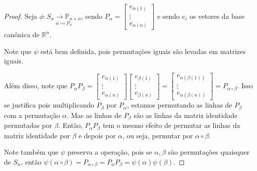 \documentclass[a4paper,portuguese,11pt,twoside, leqno]{book}
\theoremstyle{definition}
\begin{document}
	\begin{proof}
		Seja $\phi: \underset{\alpha\mapsto P_{\alpha}}{S_n\to\mathbb{P}_{n\times n}}$, sendo $\displaystyle{P_{\alpha} = \begin{bmatrix}
			e_{\alpha(1)} \\
			\vdots \\
			e_{\alpha(n)}
			\end{bmatrix}}$ e sendo $e_i$ os vetores da base canônica de $\mathbb{R}^n$.
		
		\par\vspace{0.3cm}
		
		Note que $\psi$ está bem definida, pois permutações iguais são levadas em matrizes iguais.
		
		\par\vspace{0.3cm}
		
		Além disso, note que $\displaystyle{ P_{\alpha}P_{\beta} = \begin{bmatrix}
			e_{\alpha(1)} \\
			\vdots \\
			e_{\alpha(n)}
			\end{bmatrix}\begin{bmatrix}
			e_{\beta(1)} \\
			\vdots \\
			e_{\beta(n)}
			\end{bmatrix} = \begin{bmatrix}
			e_{\alpha(\beta(1))} \\
			\vdots \\
			e_{\alpha(\beta(n))}
			\end{bmatrix} = P_{\alpha\circ\beta} }$. Isso se justifica pois multiplicando $P_{\beta}$ por $P_{\alpha}$, estamos permutando as linhas de $P_{\beta}$ com a permutação $\alpha$. Mas as linhas de $P_{\beta}$ são as linhas da matriz identidade permutadas por $\beta$. Então, $P_{\alpha}P_{\beta}$ tem o mesmo efeito de permutar as linhas da matriz identidade por $\beta$ e depois por $\alpha$, ou seja, permutar por $\alpha\circ\beta$. 
		
		\par\vspace{0.3cm}
		
		Note também que $\psi$ preserva a operação, pois se $\alpha, \beta$ são permutações quaisquer de $S_n$, então $\psi(\alpha\circ\beta) = P_{\alpha\circ\beta} = P_{\alpha}P_{\beta} = \psi(\alpha)\psi(\beta)$.
		

\end{proof}
\end{document}
